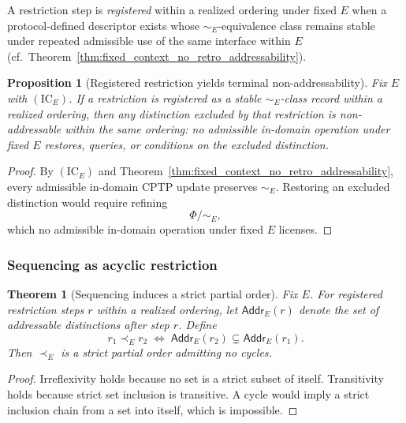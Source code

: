 \documentclass[aps,prx,onecolumn,11pt]{revtex4-2}
\theoremstyle{plain}
\newtheorem{theorem}{Theorem}
\newtheorem{proposition}{Proposition}
\theoremstyle{definition}
\theoremstyle{remark}
\begin{document}
A restriction step is \emph{registered} within a realized ordering
under fixed \(E\) when a protocol-defined descriptor exists whose
\(\sim_E\)-equivalence class remains stable under repeated admissible
use of the same interface within \(E\)
(cf.~Theorem~\ref{thm:fixed_context_no_retro_addressability}).

\begin{proposition}[Registered restriction yields terminal non-addressability]
\label{prop:registered_implies_terminal_nonaddr}
Fix \(E\) with \((\mathrm{IC}_E)\). If a restriction is registered as a
stable \(\sim_E\)-class record within a realized ordering, then any
distinction excluded by that restriction is non-addressable within the
same ordering: no admissible in-domain operation under fixed \(E\)
restores, queries, or conditions on the excluded distinction.
\end{proposition}

\begin{proof}
By \((\mathrm{IC}_E)\) and
Theorem~\ref{thm:fixed_context_no_retro_addressability}, every
admissible in-domain CPTP update preserves \(\sim_E\). Restoring an
excluded distinction would require refining
\[
\Phi/{\sim_E},
\]
which no admissible in-domain operation under fixed \(E\) licenses.
\end{proof}

\subsubsection{Sequencing as acyclic restriction}
\label{subsec:sequencing_as_restriction}

\begin{theorem}[Sequencing induces a strict partial order]
\label{thm:sequencing_strict_partial_order}
Fix \(E\). For registered restriction steps \(r\) within a realized
ordering, let \(\mathsf{Addr}_E(r)\) denote the set of addressable
distinctions after step \(r\). Define
\[
r_1\prec_E r_2
\;\Longleftrightarrow\;
\mathsf{Addr}_E(r_2)
\subsetneq
\mathsf{Addr}_E(r_1).
\]
Then \(\prec_E\) is a strict partial order admitting no cycles.
\end{theorem}

\begin{proof}
Irreflexivity holds because no set is a strict subset of itself.
Transitivity holds because strict set inclusion is transitive. A cycle
would imply a strict inclusion chain from a set into itself, which is
impossible.
\end{proof}
\end{document}
